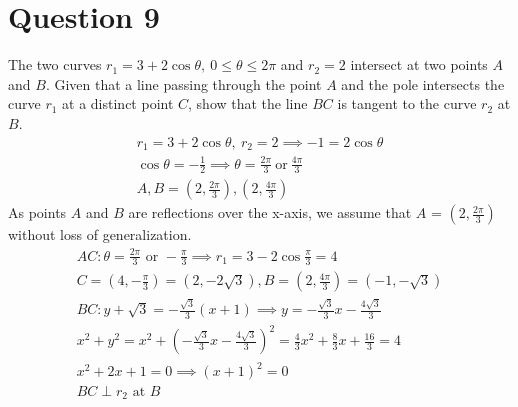 \documentclass[12pt]{article}
\begin{document}
\section{Question 9}
The two curves $r_1=3+2\cos \theta,\ 0\le \theta\le 2\pi$ and $r_2=2$ intersect at two points $A$ and $B$. Given that a line passing through the point $A$ and the pole intersects the curve $r_1$ at a distinct point $C$, show that the line $BC$ is tangent to the curve $r_2$ at $B$.
\begin{gather*}
    r_1=3+2\cos \theta,\  r_2=2 \implies -1=2\cos\theta\\
    \cos\theta=-\frac{1}{2}\implies \theta=\frac{2\pi}{3} \ \text{or}\ \frac{4\pi}{3}\\
    A, B = (2,\frac{2\pi}{3}),(2,\frac{4\pi}{3})
\end{gather*}
As points $A$ and $B$ are reflections over the x-axis, we assume that $A$ = $(2,\frac{2\pi}{3})$ without loss of generalization. 
\begin{gather*}
    AC: \theta=\frac{2\pi}{3} \text{ or } -\frac{\pi}{3}\implies r_1=3-2\cos \frac{\pi}{3}=4\\
    C=(4,-\frac{\pi}{3})=(2,-2\sqrt{3}), B=(2,\frac{4\pi}{3})=(-1,-\sqrt{3})\\
    BC:y+\sqrt{3}=-\frac{\sqrt{3}}{3}(x+1)\implies y=-\frac{\sqrt{3}}{3}x-\frac{4\sqrt{3}}{3}\\
    x^2+y^2=x^2+(-\frac{\sqrt{3}}{3}x-\frac{4\sqrt{3}}{3})^2=\frac{4}{3}x^2+\frac{8}{3}x+\frac{16}{3}=4\\
    x^2+2x+1=0\implies(x+1)^2=0\\
    \boxed{BC \perp r_2 \text{ at } B}
\end{gather*}
\end{document}
